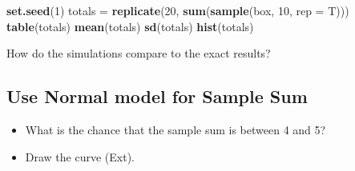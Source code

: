 \documentclass[]{article}
\newenvironment{Shaded}{\begin{snugshade}}{\end{snugshade}}
\newcommand{\DataTypeTok}[1]{\textcolor[rgb]{0.13,0.29,0.53}{#1}}
\newcommand{\DecValTok}[1]{\textcolor[rgb]{0.00,0.00,0.81}{#1}}
\newcommand{\KeywordTok}[1]{\textcolor[rgb]{0.13,0.29,0.53}{\textbf{#1}}}
\newcommand{\NormalTok}[1]{#1}
\newcommand{\StringTok}[1]{\textcolor[rgb]{0.31,0.60,0.02}{#1}}
\begin{document}
\begin{Shaded}
\begin{Highlighting}[]
\KeywordTok{set.seed}\NormalTok{(}\DecValTok{1}\NormalTok{)}
\NormalTok{totals =}\StringTok{ }\KeywordTok{replicate}\NormalTok{(}\DecValTok{20}\NormalTok{, }\KeywordTok{sum}\NormalTok{(}\KeywordTok{sample}\NormalTok{(box, }\DecValTok{10}\NormalTok{, }\DataTypeTok{rep =}\NormalTok{ T)))}
\KeywordTok{table}\NormalTok{(totals)}
\KeywordTok{mean}\NormalTok{(totals)}
\KeywordTok{sd}\NormalTok{(totals)}
\KeywordTok{hist}\NormalTok{(totals)}
\end{Highlighting}
\end{Shaded}

How do the simulations compare to the exact results?

\hypertarget{use-normal-model-for-sample-sum}{%
\subsection{Use Normal model for Sample Sum}\label{use-normal-model-for-sample-sum}}

\begin{itemize}
\item
  What is the chance that the sample sum is between 4 and 5?
\item
  Draw the curve (Ext).
\end{itemize}
\end{document}
